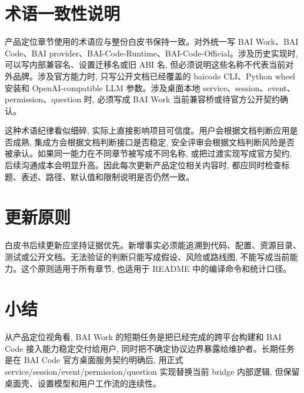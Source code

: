 \section{术语一致性说明}
产品定位章节使用的术语应与整份白皮书保持一致。对外统一写 BAI Work、BAI Code、BAI provider、BAI-Code-Runtime、BAI-Code-Official。涉及历史实现时, 可以写内部兼容名、设置迁移名或旧 ABI 名, 但必须说明这些名称不代表当前对外品牌。涉及官方能力时, 只写公开文档已经覆盖的 baicode CLI、Python wheel 安装和 OpenAI-compatible LLM 参数。涉及桌面本地 service、session、event、permission、question 时, 必须写成 BAI Work 当前兼容桥或待官方公开契约确认。

这种术语纪律看似细碎, 实际上直接影响项目可信度。用户会根据文档判断应用是否成熟, 集成方会根据文档判断接口是否稳定, 安全评审会根据文档判断风险是否被承认。如果同一能力在不同章节被写成不同名称, 或把过渡实现写成官方契约, 后续沟通成本会明显升高。因此每次更新产品定位相关内容时, 都应同时检查标题、表述、路径、默认值和限制说明是否仍然一致。

\section{更新原则}
白皮书后续更新应坚持证据优先。新增事实必须能追溯到代码、配置、资源目录、测试或公开文档。无法验证的判断只能写成假设、风险或路线图, 不能写成当前能力。这个原则适用于所有章节, 也适用于 README 中的编译命令和统计口径。

\section{小结}
从产品定位视角看, BAI Work 的短期任务是把已经完成的跨平台构建和 BAI Code 接入能力稳定交付给用户, 同时把不确定协议边界暴露给维护者。长期任务是在 BAI Code 官方桌面服务契约明确后, 用正式 service/session/event/permission/question 实现替换当前 bridge 内部逻辑, 但保留桌面壳、设置模型和用户工作流的连续性。
